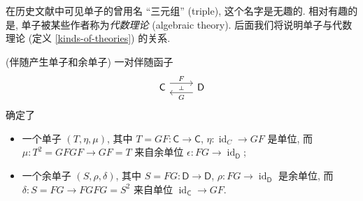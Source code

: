 \begin{remark}
	{}
	在历史文献中可见单子的曾用名 ``三元组'' (triple), 这个名字是无趣的.
	相对有趣的是, 单子被某些作者称为\emph{代数理论} (algebraic theory). 后面我们将说明单子与代数理论 (定义 \ref{kinds-of-theories}) 的关系.
\end{remark}

\begin{propdef}
    [label={monad-from-adjoint}]
    {(伴随产生单子和余单子)}
    一对伴随函子
    $$
    \begin{tikzcd}[ampersand replacement=\&]
    	{\mathsf C} \& {\mathsf D}
    	\arrow[""{name=0, anchor=center, inner sep=0}, "G", shift left=2, from=1-2, to=1-1]
    	\arrow[""{name=1, anchor=center, inner sep=0}, "F", shift left=2, from=1-1, to=1-2]
    	\arrow["\dashv"{anchor=center, rotate=-90}, draw=none, from=1, to=0]
    \end{tikzcd}
    $$
    确定了
    \begin{itemize}
    	\item 一个单子 $(T,\eta,\mu)$, 其中 $T = GF \colon \mathsf C \to \mathsf C$,
    	$\eta \colon \operatorname{id}_{C} \to GF$ 是单位, 而 $\mu \colon T^2 = GFGF \to GF = T$ 来自余单位 $\epsilon \colon FG \to \operatorname{id}_{\mathsf D}$;
    	\item 一个余单子 $(S,\rho,\delta)$, 其中 $S=FG\colon \mathsf {D}\to\mathsf {D}$,
    	$\rho \colon FG\to\operatorname{id}_{\mathsf D}$ 是余单位, 而 $\delta\colon S= FG\to FGFG = S^2$ 来自单位 $\operatorname{id}_{\mathsf C}\to GF$.
    \end{itemize}
\end{propdef}


